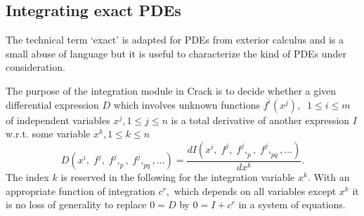 \documentclass[12pt]{article}
\begin{document}
\subsection{Integrating exact PDEs}
The technical term `exact' is adapted for PDEs from exterior calculus and
is a small abuse of language but it is useful to characterize the kind of PDEs
under consideration.

The purpose of the integration module in {\sc Crack} is to  decide
whether a given differential
expression $D$ which involves unknown functions $f^i(x^j),\;\; 1\leq i\leq m$ 
of independent variables $x^j, 1\leq j\leq n$
is a total derivative of another expression $I$
w.r.t. some variable $x^k, 1\leq k\leq n$ 
\[ D(x^i,\; f^j,\; f^j,_p,\; f^j,_{pq}, \ldots) 
     = \frac{d I(x^i,\; f^j,\; f^j,_p,\; f^j,_{pq}, \ldots)}{d x^k}. \]
The index $k$ is
reserved in the following for the integration variable $x^k.$
With an appropriate function of integration $c^r,$
which depends on all variables except $x^k$ it is no loss of generality
to replace $0 = D$ by $0 = I + c^r$ in a system of equations.
\end{document}
